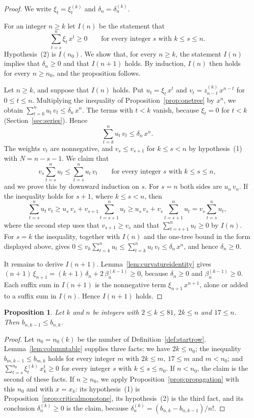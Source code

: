 \documentclass{amsart}
\newtheorem{proposition}[theorem]{Proposition}
\theoremstyle{definition}
\theoremstyle{remark}
\numberwithin{equation}{section}
\begin{document}
\begin{proof}
We write $\xi_t=\xi^{(k)}_t$ and $\delta_n=\delta^{(k)}_n$.

For an integer $n\ge k$ let $I(n)$ be the statement that
\[
\sum_{t=s}^{n}\xi_t\,x^{t}\ge 0\qquad\text{for every integer $s$ with } k\le s\le n .
\]
Hypothesis~(2) is $I(n_0)$. We show that, for every $n\ge k$, the statement $I(n)$ implies that $\delta_n\ge 0$ and that $I(n+1)$ holds. By induction, $I(n)$ then holds for every $n\ge n_0$, and the proposition follows.

Let $n\ge k$, and suppose that $I(n)$ holds. Put $u_t=\xi_t\,x^{t}$ and $v_t=z^{(k)}_{n-t}\,x^{n-t}$ for $0\le t\le n$. Multiplying the inequality of Proposition~\ref{prop:onetree} by $x^{n}$, we obtain $\sum_{t=0}^{n}u_t\,v_t\le\delta_n\,x^{n}$. The terms with $t<k$ vanish, because $\xi_t=0$ for $t<k$ (Section~\ref{sec:series}). Hence
\[
\sum_{t=k}^{n}u_t\,v_t\le\delta_n\,x^{n}.
\]
The weights $v_t$ are nonnegative, and $v_s\le v_{s+1}$ for $k\le s<n$ by hypothesis~(1) with $N=n-s-1$. We claim that
\[
v_s\sum_{t=s}^{n}u_t\le\sum_{t=s}^{n}u_t\,v_t\qquad\text{for every integer $s$ with } k\le s\le n ,
\]
and we prove this by downward induction on $s$. For $s=n$ both sides are $u_n\,v_n$. If the inequality holds for $s+1$, where $k\le s<n$, then
\[
\sum_{t=s}^{n}u_t\,v_t\ge u_s\,v_s+v_{s+1}\sum_{t=s+1}^{n}u_t\ge u_s\,v_s+v_s\sum_{t=s+1}^{n}u_t=v_s\sum_{t=s}^{n}u_t ,
\]
where the second step uses that $v_{s+1}\ge v_s$ and that $\sum_{t=s+1}^{n}u_t\ge 0$ by $I(n)$. For $s=k$ the inequality, together with $I(n)$ and the one-tree bound in the form displayed above, gives $0\le v_k\sum_{t=k}^{n}u_t\le\sum_{t=k}^{n}u_t\,v_t\le\delta_n\,x^{n}$, and hence $\delta_n\ge 0$.

It remains to derive $I(n+1)$. Lemma~\ref{lem:curvatureidentity} gives $(n+1)\,\xi_{n+1}=(k+1)\,\delta_n+2\,\beta^{(k-1)}_n\ge 0$, because $\delta_n\ge 0$ and $\beta^{(k-1)}_n\ge 0$. Each suffix sum in $I(n+1)$ is the nonnegative term $\xi_{n+1}\,x^{n+1}$, alone or added to a suffix sum in $I(n)$. Hence $I(n+1)$ holds.
\end{proof}

\begin{proposition}\label{prop:lowcolumns}
Let $k$ and $n$ be integers with $2\le k\le 81$, $2k\le n$ and $17\le n$. Then $b_{n,k-1}\le b_{n,k}$.
\end{proposition}

\begin{proof}
Let $n_0=n_0(k)$ be the number of Definition~\ref{def:startrow}. Lemma~\ref{lem:columntable} supplies three facts: we have $2k\le n_0$; the inequality $b_{m,k-1}\le b_{m,k}$ holds for every integer $m$ with $2k\le m$, $17\le m$ and $m<n_0$; and $\sum_{t=s}^{n_0}\xi^{(k)}_t\,x_k^{t}\ge 0$ for every integer $s$ with $k\le s\le n_0$. If $n<n_0$, the claim is the second of these facts. If $n\ge n_0$, we apply Proposition~\ref{prop:propagation} with this $n_0$ and with $x=x_k$: its hypothesis~(1) is Proposition~\ref{prop:criticalmonotone}, its hypothesis~(2) is the third fact, and its conclusion $\delta^{(k)}_n\ge 0$ is the claim, because $\delta^{(k)}_n=(b_{n,k}-b_{n,k-1})/n!$.
\end{proof}
\end{document}

